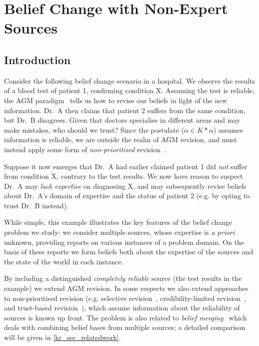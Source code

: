 \chapter{Belief Change with Non-Expert Sources}

\section{Introduction}

Consider the following belief change scenario in a hospital. We observe the
results of a blood test of patient 1, confirming condition X. Assuming the test
is reliable, the AGM paradigm~\cite{alchourron1985logic} tells us how to revise
our beliefs in light of the new information. Dr.\ A then claims that patient 2
suffers from the same condition, but Dr.\ B disagrees. Given that doctors
specialise in different areas and may make mistakes, who should we trust?
%
Since the  postulate ($\alpha \in K \ast \alpha$)
assumes information is reliable, we are outside the realm of AGM revision, and
must instead apply some form of \emph{non-prioritised}
revision~\cite{hansson1999survey}.

Suppose it now emerges that Dr.\ A had earlier claimed patient 1 did \emph{not}
suffer from condition X, contrary to the test results. We now have reason to
suspect Dr.\ A may \emph{lack expertise} on diagnosing X, and may subsequently
revise beliefs about Dr.\ A's domain of expertise and the status of patient
2 (e.g. by opting to trust Dr.\ B instead).

While simple, this example illustrates the key features of the belief change
problem we study: we consider multiple sources, whose expertise is \emph{a
priori} unknown, providing reports on various instances of a problem domain. On
the basis of these reports we form beliefs both about the expertise of the
sources and the state of the world in each instance.

By including a distinguished \emph{completely reliable} source (the test
results in the example) we extend AGM revision. In some respects we also extend
approaches to non-prioritised revision (e.g. selective
revision~\cite{ferme1999selective}, credibility-limited
revision~\cite{hansson_2001}, and trust-based
revision~\cite{booth_trust_2018}), which assume information about the
reliability of sources is known up front. The problem is also related to
\emph{belief merging}~\cite{konieczny2002merging} which deals
with combining belief bases from multiple sources; a detailed comparison will
be given in \cref{kr_sec_relatedwork}.

